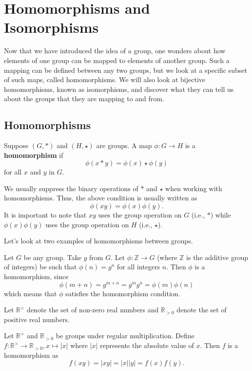 \chapter{Homomorphisms and Isomorphisms}
Now that we have introduced the idea of a group, one wonders about how elements of one group can be mapped to elements of another group. Such a mapping can be defined between any two groups, but we look at a specific subset of such maps, called homomorphisms. We will also look at bijective homomorphisms, known as isomorphisms, and discover what they can tell us about the groups that they are mapping to and from.

\section{Homomorphisms}
\begin{definition}
    Suppose $(G, \ast)$ and $(H, \star)$ are groups. A map $\phi: G \to H$ is a \textbf{homomorphism} if
    \[
        \phi(x \ast y) = \phi(x) \star \phi(y)
    \]
    for all $x$ and $y$ in $G$.
\end{definition}
\begin{remark}
    We usually suppress the binary operations of $\ast$ and $\star$ when working with homomorphisms. Thus, the above condition is usually written as
    \[
        \phi(xy) = \phi(x)\phi(y).
    \]
    It is important to note that $xy$ uses the group operation on $G$ (i.e., $\ast$) while $\phi(x)\phi(y)$ uses the group operation on $H$ (i.e., $\star$).
\end{remark}

\newpage

Let's look at two examples of homomorphisms between groups.
\begin{example}
    Let $G$ be any group. Take $g$ from $G$. Let $\phi: \mathbb{Z} \to G$ (where $\mathbb{Z}$ is the additive group of integers) be such that $\phi(n) = g^n$ for all integers $n$. Then $\phi$ is a homomorphism, since
    \[
        \phi(m + n) = g^{m+n} = g^m g^n = \phi(m)\phi(n)
    \]
    which means that $\phi$ satisfies the homomorphism condition.
\end{example}

\begin{example}
    Let $\mathbb{R}^\times$ denote the set of non-zero real numbers and $\mathbb{R}_{>0}$ denote the set of positive real numbers.

    Let $\mathbb{R}^\times$ and $\mathbb{R}_{>0}$ be groups under regular multiplication. Define $f: \mathbb{R}^\times \to \mathbb{R}_{>0}, x \mapsto |x|$ where $|x|$ represents the absolute value of $x$. Then $f$ is a homomorphism as
    \[
        f(xy) = |xy| = |x||y| = f(x)f(y).
    \]
\end{example}

